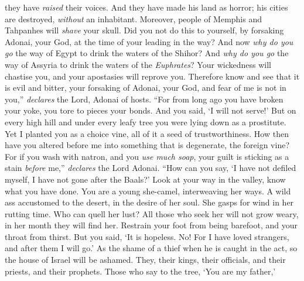 \begin{biblechapter}
they have \textit{raised} their voices. 
And they have made his land as horror; 
his cities are destroyed, \textit{without} an inhabitant.
\verse Moreover, people of Memphis and Tahpanhes 
will \textit{shave} your skull.
\verse Did you not do this to yourself, 
by forsaking Adonai, your God, 
at the time of your leading in the way?
\verse And now \textit{why do you go} the way of Egypt 
to drink the waters of the Shihor? 
And \textit{why do you go} the way of Assyria 
to drink the waters of the \textit{Euphrates}?
\verse Your wickedness will chastise you, 
and your apostasies will reprove you. 
Therefore know and see that it is evil and bitter, 
your forsaking of Adonai, your God, 
and fear of me is not in you,” 
\textit{declares} the Lord, Adonai of hosts.
\verse “For from long ago you have broken your yoke, 
you tore to pieces your bonds. 
And you said, ‘I will not serve!’ 
But on every high hill and under every leafy tree 
you were lying down as a prostitute.
\verse Yet I planted you as a choice vine, 
all of it a seed of trustworthiness. 
How then have you altered before me 
into something that is degenerate, the foreign vine?
\verse For if you wash with natron, 
and you \textit{use much soap}, 
your guilt is sticking as a stain \textit{before} me,” 
\textit{declares} the Lord Adonai.
\verse “How can you say, ‘I have not defiled myself, 
I have not gone after the Baals?’ 
Look at your way in the valley, 
know what you have done. 
You are a young she-camel, 
interweaving her ways.
\verse A wild ass accustomed to the desert, 
in the desire of her soul. 
She gasps for wind in her rutting time. 
Who can quell her lust? 
All those who seek her will not grow weary, 
in her month they will find her.
\verse Restrain your foot from being barefoot, 
and your throat from thirst. 
But you said, ‘It is hopeless. 
No! For I have loved strangers, 
and after them I will go.’
\verse As the shame of a thief when he is caught in the act, 
so the house of Israel will be ashamed. 
They, their kings, their officials, 
and their priests, and their prophets.
\verse Those who say to the tree, ‘You are my father,’ 

\end{biblechapter}
